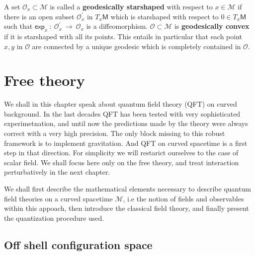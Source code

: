 \documentclass[10pt]{book}
\newcommand{\Mcal}{\mathcal{M}}
\newcommand{\Ocal}{\mathcal{O}}
\newcommand{\Msf}{\mathsf{M}}
\theoremstyle{break}
\newtheorem{definition}{Definition}
\begin{document}
A set $\Ocal_x \subset \Mcal$ is called a \textbf{geodesically starshaped} with respect to $x \in \Mcal$ if there is an open subset $\Ocal^{\prime}_x$ in $T_x\Msf$ which is starshaped with respect to $0 \in T_x\Msf$ such that $\mathsf{exp}_x \ : \ \Ocal^{\prime}_x \ \to \ \Ocal_x$ is a diffeomorphism. 
%
%
$\Ocal \subset \Mcal$ is \textbf{geodesically convex} if it is starshaped with all its points. This entails in particular that each point $x,y$ in $\Ocal$ are connected by a unique geodesic which is completely contained in $\Ocal$.


\chapter{Free theory}


We shall in this chapter speak about quantum field theory (QFT) on curved background. In the last decades QFT has been tested with very sophisticated experimetnation, and until now the predictions made by the theory were always correct with a very high precision. The only block missing to this robust framework is to implement gravitation. And QFT on curved spacetime is a first step in that direction. For simplicity we will restarict ourselves to the case of scalar field. We shall focus here only on the free theory, and treat interaction perturbatively in the next chapter.\par%


\bigskip


We shall first describe the mathematical elements necessary to describe quantum field theories on a curved spacetime $\Mcal$, i.e the notion of fields and observables within this appoach, then introduce the classical field theory, and finally present the quantization procedure used.


\section{Off shell configuration space}
\end{document}
